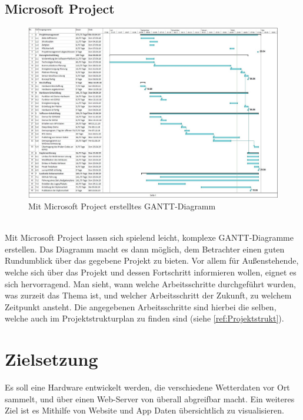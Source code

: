 \pagebreak
        
    \subsection{Microsoft Project} \label{ref:MSProject}
    
        \begin{figure}[H]
            \centering
            \includegraphics[width=1\textwidth]{./media/images/GANTT.jpg}
            \caption{Mit Microsoft Project erstelltes GANTT-Diagramm}
            \label{fig:GANTT}
        \end{figure}
        
        \ \\ Mit Microsoft Project lassen sich spielend leicht, komplexe GANTT-Diagramme erstellen. Das Diagramm macht es dann möglich, dem Betrachter einen guten Rundumblick über das gegebene Projekt zu bieten. Vor allem für Außenstehende, welche sich über das Projekt und dessen Fortschritt informieren wollen, eignet es sich hervorragend. Man sieht, wann welche Arbeitsschritte durchgeführt wurden, was zurzeit das Thema ist, und welcher Arbeitsschritt der Zukunft, zu welchem Zeitpunkt ansteht. Die angegebenen Arbeitsschritte sind hierbei die selben, welche auch im Projektstrukturplan zu finden sind (siehe \ref{ref:Projektstrukt}).

\pagebreak

\section{Zielsetzung}
    Es soll eine Hardware entwickelt werden, die verschiedene Wetterdaten vor Ort sammelt, und über einen Web-Server von überall abgreifbar macht. Ein weiteres Ziel ist es Mithilfe von Website und App Daten übersichtlich zu visualisieren.
    
